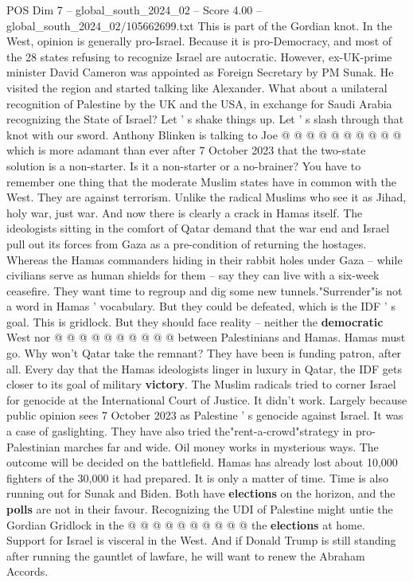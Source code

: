 \begin{textsample}{POS Dim 7 – global\_south\_2024\_02 – Score 4.00 – global\_south\_2024\_02/105662699.txt}
This is part of the Gordian knot.
In the West, opinion is generally pro-Israel.
Because it is pro-Democracy, and most of the 28 states refusing to recognize Israel are autocratic.
However, ex-UK-prime minister David Cameron was appointed as Foreign Secretary by PM Sunak.
He visited the region and started talking like Alexander.
What about a unilateral recognition of Palestine by the UK and the USA, in exchange for Saudi Arabia recognizing the State of Israel?
Let ' s shake things up.
Let ' s slash through that knot with our sword.
Anthony Blinken is talking to Joe @ @ @ @ @ @ @ @ @ @ which is more adamant than ever after 7 October 2023 that the two-state solution is a non-starter.
Is it a non-starter or a no-brainer?
You have to remember one thing that the moderate Muslim states have in common with the West.
They are against terrorism.
Unlike the radical Muslims who see it as Jihad, holy war, just war.
And now there is clearly a crack in Hamas itself.
The ideologists sitting in the comfort of Qatar demand that the war end and Israel pull out its forces from Gaza as a pre-condition of returning the hostages.
Whereas the Hamas commanders hiding in their rabbit holes under Gaza -- while civilians serve as human shields for them -- say they can live with a six-week ceasefire.
They want time to regroup and dig some new tunnels."Surrender"is not a word in Hamas ' vocabulary.
But they could be defeated, which is the IDF ' s goal.
This is gridlock.
But they should face reality -- neither the \textbf{democratic} West nor @ @ @ @ @ @ @ @ @ @ between Palestinians and Hamas.
Hamas must go.
Why won't Qatar take the remnant?
They have been is funding patron, after all.
Every day that the Hamas ideologists linger in luxury in Qatar, the IDF gets closer to its goal of military \textbf{victory}.
The Muslim radicals tried to corner Israel for genocide at the International Court of Justice.
It didn't work.
Largely because public opinion sees 7 October 2023 as Palestine ' s genocide against Israel.
It was a case of gaslighting.
They have also tried the"rent-a-crowd"strategy in pro-Palestinian marches far and wide.
Oil money works in mysterious ways.
The outcome will be decided on the battlefield.
Hamas has already lost about 10,000 fighters of the 30,000 it had prepared.
It is only a matter of time.
Time is also running out for Sunak and Biden.
Both have \textbf{elections} on the horizon, and the \textbf{polls} are not in their favour.
Recognizing the UDI of Palestine might untie the Gordian Gridlock in the @ @ @ @ @ @ @ @ @ @ the \textbf{elections} at home.
Support for Israel is visceral in the West.
And if Donald Trump is still standing after running the gauntlet of lawfare, he will want to renew the Abraham Accords.

\end{textsample}
